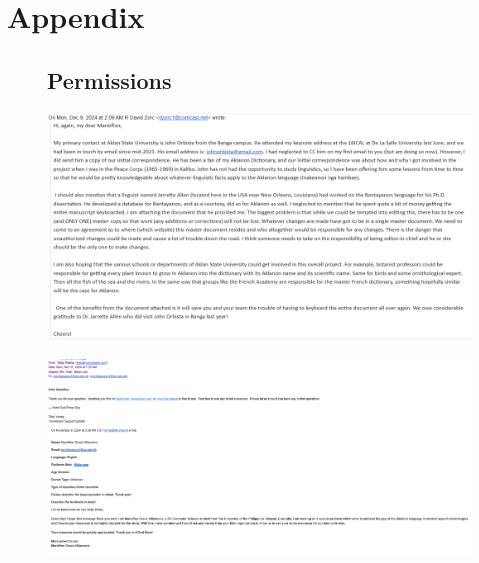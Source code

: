 %
%
%                 

\chapter{Appendix}
\label{sec:appendix}

\begin{figure}
\section{Permissions}
	\centering
	\includegraphics[width=\textwidth]{dav.png}
	\label{fig:sirDavid}
\end{figure}
\begin{figure}[h!]
	\centering
	\includegraphics[width=\textwidth]{biblepermision.png}
	\label{fig:bible}
\end{figure}

